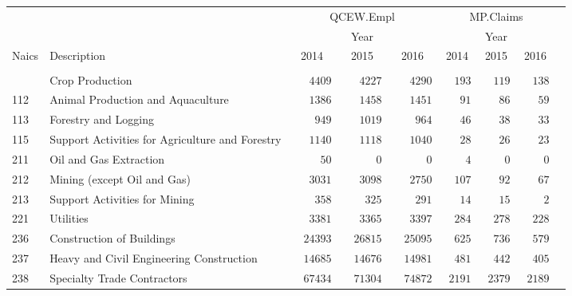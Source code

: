\documentclass[9pt, oneside]{article}   	%
\begin{document}
\begin{longtable}{lp{3 in}ccccccc}
\label{Table: 10b.MPc}\\
 \hline
                          \toprule
 &  & \multicolumn{3}{c}{QCEW.Empl} & \multicolumn{3}{c}{MP.Claims} \\ 
 &  & \multicolumn{3}{c}{Year} & \multicolumn{3}{c}{Year} \\ 
Naics  & Description & 2014 & 2015 & 2016 & 2014 & 2015 & \multicolumn{1}{c}{2016} \\ 
\midrule\\ [-1\normalbaselineskip]\hline\endhead\hline\endfoot
111  & Crop Production & $\phantom{000}4409$ & $\phantom{000}4227$ & $\phantom{000}4290$ & $\phantom{00}193$ & $\phantom{00}119$ & $\phantom{00}138$ \\
112  & Animal Production and Aquaculture & $\phantom{000}1386$ & $\phantom{000}1458$ & $\phantom{000}1451$ & $\phantom{000}91$ & $\phantom{000}86$ & $\phantom{000}59$ \\
113  & Forestry and Logging & $\phantom{0000}949$ & $\phantom{000}1019$ & $\phantom{0000}964$ & $\phantom{000}46$ & $\phantom{000}38$ & $\phantom{000}33$ \\
115  & Support Activities for Agriculture and Forestry & $\phantom{000}1140$ & $\phantom{000}1118$ & $\phantom{000}1040$ & $\phantom{000}28$ & $\phantom{000}26$ & $\phantom{000}23$ \\
211  & Oil and Gas Extraction & $\phantom{00000}50$ & $\phantom{000000}0$ & $\phantom{000000}0$ & $\phantom{0000}4$ & $\phantom{0000}0$ & $\phantom{0000}0$ \\
212  & Mining (except Oil and Gas) & $\phantom{000}3031$ & $\phantom{000}3098$ & $\phantom{000}2750$ & $\phantom{00}107$ & $\phantom{000}92$ & $\phantom{000}67$ \\
213  & Support Activities for Mining & $\phantom{0000}358$ & $\phantom{0000}325$ & $\phantom{0000}291$ & $\phantom{000}14$ & $\phantom{000}15$ & $\phantom{0000}2$ \\
221  & Utilities & $\phantom{000}3381$ & $\phantom{000}3365$ & $\phantom{000}3397$ & $\phantom{00}284$ & $\phantom{00}278$ & $\phantom{00}228$ \\
236  & Construction of Buildings & $\phantom{00}24393$ & $\phantom{00}26815$ & $\phantom{00}25095$ & $\phantom{00}625$ & $\phantom{00}736$ & $\phantom{00}579$ \\
237  & Heavy and Civil Engineering Construction & $\phantom{00}14685$ & $\phantom{00}14676$ & $\phantom{00}14981$ & $\phantom{00}481$ & $\phantom{00}442$ & $\phantom{00}405$ \\
238  & Specialty Trade Contractors & $\phantom{00}67434$ & $\phantom{00}71304$ & $\phantom{00}74872$ & $\phantom{0}2191$ & $\phantom{0}2379$ & $\phantom{0}2189$ \\

\end{longtable}
\end{document}
